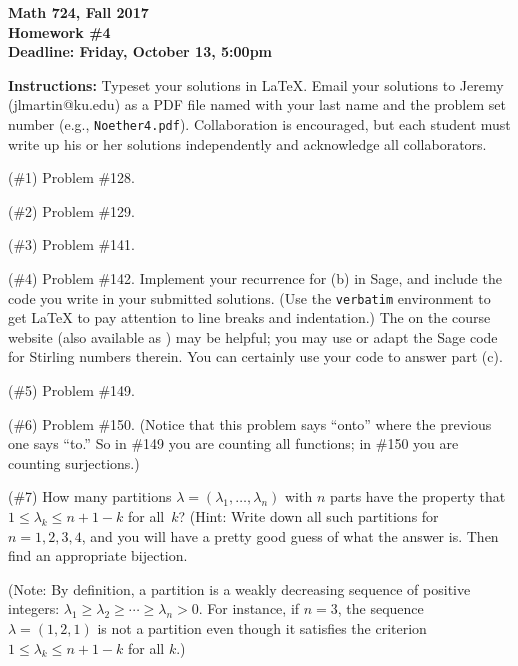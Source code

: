 

\thispagestyle{empty}

\textbf{Math 724, Fall 2017\\
Homework \#4\\
Deadline: Friday, October 13, 5:00pm}

\textbf{Instructions:} Typeset your solutions in LaTeX.  Email your solutions to Jeremy (jlmartin@ku.edu) as a PDF file named with your last name and the problem set number (e.g., {\tt Noether4.pdf}).  Collaboration is encouraged, but each student must write up his or her solutions independently and acknowledge all collaborators.

(\#1) Problem \#128.

(\#2) Problem \#129.

(\#3) Problem \#141.

(\#4) Problem \#142.
Implement your recurrence for (b) in Sage, and include the code you write in your submitted solutions.  (Use the {\tt verbatim} environment to get LaTeX to pay attention to line breaks and indentation.)  The  on the course website (also available as ) may be helpful; you may use or adapt the Sage code for Stirling numbers therein.  You can certainly use your code to answer part (c).

(\#5) Problem \#149.

(\#6) Problem \#150.  (Notice that this problem says ``onto'' where the previous one says ``to.''  So in \#149 you are counting all functions; in \#150 you are counting surjections.)

(\#7)  How many partitions $\lambda=(\lambda_1,\dots,\lambda_n)$ with $n$ parts have the property that $1\leq\lambda_k\leq n+1-k$ for all~$k$?  (Hint: Write down all such partitions for $n=1,2,3,4$, and you will have a pretty good guess of what the answer is.  Then find an appropriate bijection.

(Note: By definition, a partition is a weakly decreasing sequence of positive integers: $\lambda_1\geq\lambda_2\geq\cdots\geq\lambda_n>0$.  For instance, if $n=3$, the sequence $\lambda=(1,2,1)$ is not a partition even though it satisfies the criterion $1\leq\lambda_k\leq n+1-k$ for all $k$.)
